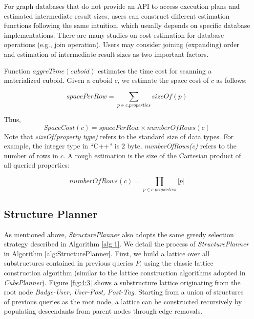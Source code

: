 For graph databases that do not provide an API to access execution plans and estimated intermediate result sizes, users can construct different estimation functions following the same intuition, which usually depends on specific database implementations. There are many studies on cost estimation for database operations (e.g., join operation). Users may consider joining (expanding) order \cite{DBLP:conf/pods/Chaudhuri98} and estimation of intermediate result sizes  \cite{DBLP:conf/edbt/SwamiS94} as two important factors.

Function \textbf{$aggreTime(cuboid)$} estimates the time cost for scanning a materialized cuboid. Given a cuboid $c$, we estimate the space cost of $c$ as follows:


\begin{displaymath}
spacePerRow = 
\displaystyle{\sum_{p\in c.properties}sizeOf(p)}
\end{displaymath}

\noindent Thus,
\begin{displaymath}
SpaceCost(c) = spacePerRow \times numberOfRows(c)
\end{displaymath}
Note that \textit{sizeOf(property type)} refers to the standard size of data types. For example, the integer type in ``C++'' is 2 byte. \textit{numberOfRows(c)} refers to the number of rows in $c$. A rough estimation is the size of the Cartesian product of all queried properties:

\begin{displaymath}
numberOfRows(c) = \displaystyle{\prod_{p\in c.properties}|p|}
\end{displaymath}


\subsection{Structure Planner}
\label{Structure Planner}
As mentioned above, \emph{StructurePlanner} also adopts the same greedy selection strategy described in Algorithm \ref{alg:1}. We detail the process of \emph{StructurePlanner} in Algorithm \ref{alg:StructurePlanner}. First, we build a lattice over all substructures contained in previous queries $P$, using the classic lattice construction algorithm (similar to the lattice construction algorithms adopted in \emph{CubePlanner}). Figure \ref{fig:4:3} shows a substructure lattice originating from the root node \textit{Badge-User, User-Post, Post-Tag}. Starting from a union of structures of previous queries as the root node, a lattice can be constructed recursively by populating descendants from parent nodes through edge removals.

